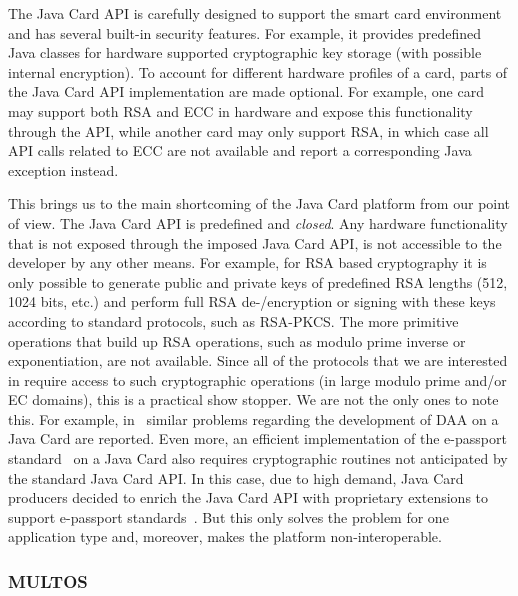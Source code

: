 
The Java Card API is carefully designed to support the smart card
environment and has several built-in security features. For example,
it provides predefined Java classes for hardware supported
cryptographic key storage (with possible internal encryption). To
account for different hardware profiles of a card, parts of the Java
Card API implementation are made optional. For example, one card may
support both RSA and ECC in hardware and expose this functionality
through the API, while another card may only support RSA, in which
case all API calls related to ECC are not available and report a
corresponding Java exception instead.

This brings us to the main shortcoming of the Java Card platform from our
point of view. The Java Card API is predefined
and \emph{closed}. Any hardware functionality that is not exposed
through the imposed Java Card API, is not accessible to the developer
by any other means. For example, for RSA based cryptography it is only
possible to generate public and private keys of predefined RSA lengths
(512, 1024 bits, etc.) and perform full RSA de-/encryption or signing
with these keys according to standard protocols, such as RSA-PKCS.  The
more primitive operations that build up RSA operations, such as modulo
prime inverse or exponentiation, are not available. Since all of the
protocols that we are interested in require access to such cryptographic operations
(in large modulo prime and/or EC domains), this is a practical show
stopper. We are not the only ones to note this. For example,
in~\cite{Sterckx09}
similar problems regarding the development of DAA on a Java Card are
reported.  Even more, an efficient implementation of the e-passport
standard~\cite{EAC20} on a Java Card also requires cryptographic
routines not anticipated by the standard Java Card API. In this case,
due to high demand, Java Card producers decided to enrich the Java
Card API with proprietary extensions to support e-passport
standards~\cite{NXP09}. But this only solves the problem for one
application type and, moreover, makes the platform non-interoperable.

\subsubsection{MULTOS}\label{sec:multos}

